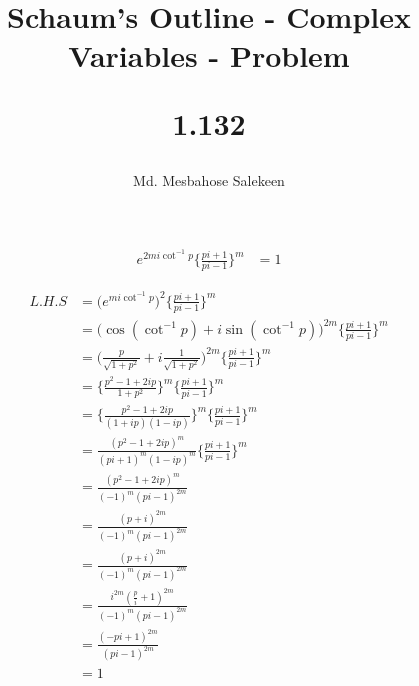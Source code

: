 \documentclass[fleqn]{article}
\title{Schaum's Outline - Complex Variables - Problem
\author{Md. Mesbahose Salekeen} 1.132}
\begin{document}
\maketitle


\begin{align*}
e^{2mi\cot^{-1}p}\Big\{\frac{pi+1}{pi-1}\Big\}^{m} &= 1
\end{align*}

\begin{align*}
		L.H.S &= \bigg(e^{mi\cot^{-1}p}\bigg)^{2}\Big\{\frac{pi+1}{pi-1}\Big\}^{m} \\
			  &= \bigg(\cos(\cot^{-1}p)+i\sin(\cot^{-1}p)\bigg)^{2m}\Big\{\frac{pi+1}{pi-1}\Big\}^{m}\\ 
			  &=\bigg(\frac{p}{\sqrt{1+p^{2}}}+i\frac{1}{\sqrt{1+p^{2}}}\bigg)^{2m}\Big\{\frac{pi+1}{pi-1}\Big\}^{m}\\
			  &=\Big\{\frac{p^{2}-1+2ip}{1+p^{2}}\Big\}^{m}\Big\{\frac{pi+1}{pi-1}\Big\}^{m}\\
			  &=\Big\{\frac{p^{2}-1+2ip}{(1+ip)(1-ip)}\Big\}^{m}\Big\{\frac{pi+1}{pi-1}\Big\}^{m}\\
			  &=\frac{(p^{2}-1+2ip)^{m}}{(pi+1)^{m}(1-ip)^{m}}\Big\{\frac{pi+1}{pi-1}\Big\}^{m}\\
			  &=\frac{(p^{2}-1+2ip)^{m}}{(-1)^{m}(pi-1)^{2m}}\\
			  &=\frac{(p+i)^{2m}}{(-1)^{m}(pi-1)^{2m}}\\
			  &=\frac{(p+i)^{2m}}{(-1)^{m}(pi-1)^{2m}}\\
			  &=\frac{i^{2m}(\frac{p}{i}+1)^{2m}}{(-1)^{m}(pi-1)^{2m}}\\
			  &=\frac{(-pi+1)^{2m}}{(pi-1)^{2m}}\\
			  &=1
\end{align*}

\begin{flushright}
[Showed]
\end{flushright}
\end{document}
